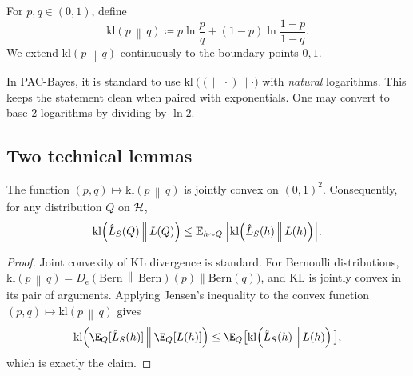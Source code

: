 \documentclass{article}
\numberwithin{equation}{section}
\newcommand{\mathify}[1]{\ifmmode{#1}\else\mbox{$#1$}\fi}
\newcommand{\Esub}[2]{\mathify{\mathbb{E}_{#1}\left[#2\right]}}
\newcommand{\Bern}{{\mbox{Bern}}}
\newcommand{\kl}[2]{\mathrm{kl}\!\left(#1\,\middle\|\,#2\right)}
\newcommand{\KLnat}[2]{D_{\mathrm{e}}\!\left(#2\,\middle\|\,#2\right)}
\newcommand{\cH}{{\cal H}}
\begin{document}
\begin{definition}[Binary KL]
For $p,q\in(0,1)$, define
\begin{equation}
    \kl{p}{q} \coloneqq p\ln\frac{p}{q} + (1-p)\ln\frac{1-p}{1-q}.
\end{equation}
We extend $\kl{p}{q}$ continuously to the boundary points $0,1$.
\end{definition}

\begin{remark}
In PAC-Bayes, it is standard to use $\kl(\cdot\|\cdot)$ with \emph{natural} logarithms.
This keeps the statement clean when paired with exponentials.
One may convert to base-2 logarithms by dividing by $\ln 2$.
\end{remark}

\subsection{Two technical lemmas}

\begin{lemma}
\label{lem:bern-kl-convex}
The function $(p,q)\mapsto \kl{p}{q}$ is jointly convex on $(0,1)^2$.
Consequently, for any distribution $Q$ on $\cH$,
\begin{equation}
    \kl{\hat L_S(Q)}{L(Q)} \le \Esub{h\sim Q}{\kl{\hat L_S(h)}{L(h)}}.
\end{equation}
\end{lemma}
\begin{proof}
Joint convexity of KL divergence is standard.
For Bernoulli distributions, $\kl{p}{q}=\KLnat(\Bern(p)\|\Bern(q))$, and KL is jointly convex in its pair of arguments.
Applying Jensen's inequality to the convex function $(p,q)\mapsto \kl{p}{q}$ gives
\begin{equation}
    \kl{\E_Q[\hat L_S(h)]}{\E_Q[L(h)]}
    \le \E_Q\big[\kl{\hat L_S(h)}{L(h)}\big],
\end{equation}
which is exactly the claim.
\end{proof}
\end{document}
